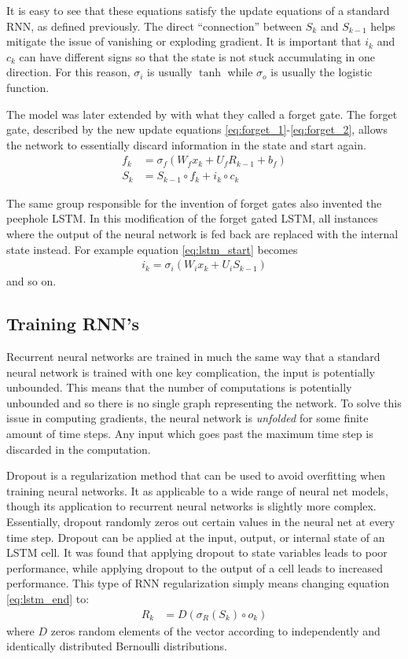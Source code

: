 It is easy to see that these equations satisfy the update equations of a standard RNN, as defined previously.  The direct ``connection'' between $S_k$ and $S_{k-1}$ helps mitigate the issue of vanishing or exploding gradient.  It is important that $i_k$ and $c_k$ can have different signs so that the state is not stuck accumulating in one direction.  For this reason, $\sigma_i$ is usually $\tanh$ while $\sigma_o$ is usually the logistic function.

The model was later extended by \cite{fg00} with what they called a forget gate.  The forget gate, described by the new update equations \ref{eq:forget_1}-\ref{eq:forget_2}, allows the network to essentially discard information in the state and start again.
\begin{align}
f_k &= \sigma_f(W_fx_k + U_fR_{k-1} + b_f)\label{eq:forget_1}\\
S_k &= S_{k-1}\circ f_k + i_k \circ c_k\label{eq:forget_2}
\end{align}

The same group responsible for the invention of forget gates also invented the peephole LSTM. \cite{fg00_2} In this modification of the forget gated LSTM, all instances where the output of the neural network is fed back are replaced with the internal state instead.  For example equation \ref{eq:lstm_start} becomes 
\begin{align}\label{eq:peephole}
i_k = \sigma_i(W_ix_k + U_iS_{k-1})
\end{align}
and so on.

\subsection{Training RNN's}\label{sec:rnn_training}
Recurrent neural networks are trained in much the same way that a standard neural network is trained with one key complication, the input is potentially unbounded.  This means that the number of computations is potentially unbounded and so there is no single graph representing the network.  To solve this issue in computing gradients, the neural network is \emph{unfolded} for some finite amount of time steps.  Any input which goes past the maximum time step is discarded in the computation.

Dropout is a regularization method that can be used to avoid overfitting when training neural networks.  It as applicable to a wide range of neural net models, though its application to recurrent neural networks is slightly more complex.  Essentially, dropout randomly zeros out certain values in the neural net at every time step.  Dropout can be applied at the input, output, or internal state of an LSTM cell.  It was found that applying dropout to state variables leads to poor performance, while applying dropout to the output of a cell leads to increased performance. \cite{wz14} This type of RNN regularization simply means changing equation \ref{eq:lstm_end} to:
\begin{align}
R_k &= D(\sigma_R(S_k) \circ o_k)
\end{align}
where $D$ zeros random elements of the vector according to independently and identically distributed Bernoulli distributions.

